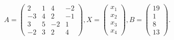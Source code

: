 \documentclass[12pt]{article}
\begin{document}
$ \begin{equation*}A=\begin{pmatrix}2 & 1 & 4 & -2 \\-3 & 4 & 2 & -1 \\3 & 5 & -2 & 1 \\ -2 & 3 & 2 & 4\end{pmatrix}, X=\begin{pmatrix}x_1 \\x_2 \\x_3 \\ x_4\end{pmatrix}, B = \begin{pmatrix}19 \\1 \\8 \\ 13\end{pmatrix}.\end{equation*} $
\end{document}
